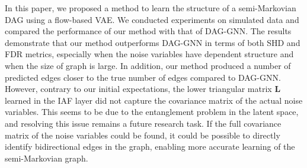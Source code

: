 \documentclass[10pt]{article}
\begin{document}
In this paper, we proposed a method to learn the structure of a semi-Markovian DAG using a flow-based VAE. We conducted experiments on simulated data and compared the performance of our method with that of DAG-GNN. The results demonstrate that our method outperforms DAG-GNN in terms of both SHD and FDR metrics, especially when the noise variables have dependent structure and when the size of graph is large. In addition, our method produced a number of predicted edges closer to the true number of edges compared to DAG-GNN.\\

However, contrary to our initial expectations, the lower triangular matrix $\mathbf L$ learned in the IAF layer did not capture the covariance matrix of the actual noise variables. This seems to be due to the entanglement problem in the latent space, and resolving this issue remains a future research task. If the full covariance matrix of the noise variables could be found, it could be possible to directly identify bidirectional edges in the graph, enabling more accurate learning of the semi-Markovian graph.



\end{document}
